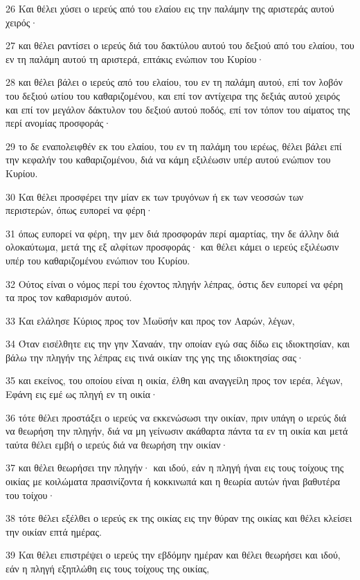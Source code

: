 \par 26 Και θέλει χύσει ο ιερεύς από του ελαίου εις την παλάμην της αριστεράς αυτού χειρός·
\par 27 και θέλει ραντίσει ο ιερεύς διά του δακτύλου αυτού του δεξιού από του ελαίου, του εν τη παλάμη αυτού τη αριστερά, επτάκις ενώπιον του Κυρίου·
\par 28 και θέλει βάλει ο ιερεύς από του ελαίου, του εν τη παλάμη αυτού, επί τον λοβόν του δεξιού ωτίου του καθαριζομένου, και επί τον αντίχειρα της δεξιάς αυτού χειρός και επί τον μεγάλον δάκτυλον του δεξιού αυτού ποδός, επί τον τόπον του αίματος της περί ανομίας προσφοράς·
\par 29 το δε εναπολειφθέν εκ του ελαίου, του εν τη παλάμη του ιερέως, θέλει βάλει επί την κεφαλήν του καθαριζομένου, διά να κάμη εξιλέωσιν υπέρ αυτού ενώπιον του Κυρίου.
\par 30 Και θέλει προσφέρει την μίαν εκ των τρυγόνων ή εκ των νεοσσών των περιστερών, όπως ευπορεί να φέρη·
\par 31 όπως ευπορεί να φέρη, την μεν διά προσφοράν περί αμαρτίας, την δε άλλην διά ολοκαύτωμα, μετά της εξ αλφίτων προσφοράς· και θέλει κάμει ο ιερεύς εξιλέωσιν υπέρ του καθαριζομένου ενώπιον του Κυρίου.
\par 32 Ούτος είναι ο νόμος περί του έχοντος πληγήν λέπρας, όστις δεν ευπορεί να φέρη τα προς τον καθαρισμόν αυτού.
\par 33 Και ελάλησε Κύριος προς τον Μωϋσήν και προς τον Ααρών, λέγων,
\par 34 Όταν εισέλθητε εις την γην Χαναάν, την οποίαν εγώ σας δίδω εις ιδιοκτησίαν, και βάλω την πληγήν της λέπρας εις τινά οικίαν της γης της ιδιοκτησίας σας·
\par 35 και εκείνος, του οποίου είναι η οικία, έλθη και αναγγείλη προς τον ιερέα, λέγων, Εφάνη εις εμέ ως πληγή εν τη οικία·
\par 36 τότε θέλει προστάξει ο ιερεύς να εκκενώσωσι την οικίαν, πριν υπάγη ο ιερεύς διά να θεωρήση την πληγήν, διά να μη γείνωσιν ακάθαρτα πάντα τα εν τη οικία και μετά ταύτα θέλει εμβή ο ιερεύς διά να θεωρήση την οικίαν·
\par 37 και θέλει θεωρήσει την πληγήν· και ιδού, εάν η πληγή ήναι εις τους τοίχους της οικίας με κοιλώματα πρασινίζοντα ή κοκκινωπά και η θεωρία αυτών ήναι βαθυτέρα του τοίχου·
\par 38 τότε θέλει εξέλθει ο ιερεύς εκ της οικίας εις την θύραν της οικίας και θέλει κλείσει την οικίαν επτά ημέρας.
\par 39 Και θέλει επιστρέψει ο ιερεύς την εβδόμην ημέραν και θέλει θεωρήσει και ιδού, εάν η πληγή εξηπλώθη εις τους τοίχους της οικίας,
